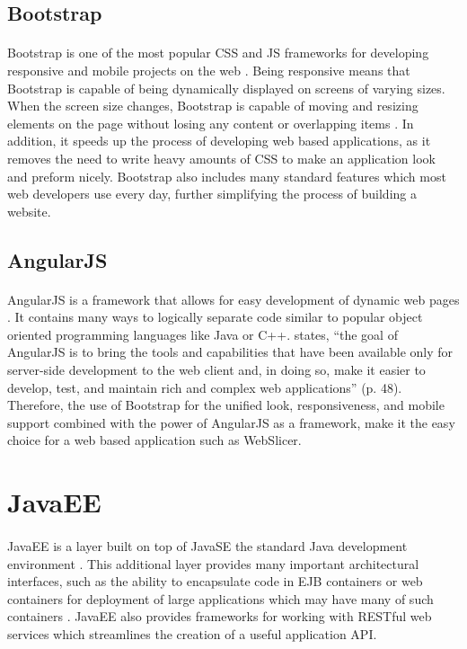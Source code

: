 \subsection{Bootstrap}
\paragraph{}
Bootstrap is one of the most popular CSS and JS frameworks for developing responsive and mobile projects on the web \citep{bootstrap-2016}.
Being responsive means that Bootstrap is capable of being dynamically displayed on screens of varying sizes. 
When the screen size changes, Bootstrap is capable of moving and resizing elements on the page without losing any content or overlapping items \citep{mango-2013}.
In addition, it speeds up the process of developing web based applications, as it removes the need to write heavy amounts of CSS to make an application look and preform nicely.
Bootstrap also includes many standard features which most web developers use every day, further simplifying the process of building a website.

\subsection{AngularJS}
\paragraph{}
AngularJS is a framework that allows for easy development of dynamic web pages \citep{angular-2016}.
It contains many ways to logically separate code similar to popular object oriented programming languages like Java or C++.
\citet{freeman-2014} states, ``the goal of AngularJS is to bring the tools and capabilities that have been available only for server-side development to the web client and, in doing so, make it easier to develop, test, and maintain rich and complex web applications'' (p. 48).
Therefore, the use of Bootstrap for the unified look, responsiveness, and mobile support combined with the power of AngularJS as a framework, make it the easy choice for a web based application such as WebSlicer.

\section{JavaEE}
\paragraph{}
JavaEE is a layer built on top of JavaSE the standard Java development environment \citep{java-2016}.
This additional layer provides many important architectural interfaces, such as the ability to encapsulate code in EJB containers or web containers for deployment of large applications which may have many of such containers \citep{pilgrim-2013}.
JavaEE also provides frameworks for working with RESTful web services which streamlines the creation of a useful application API.

